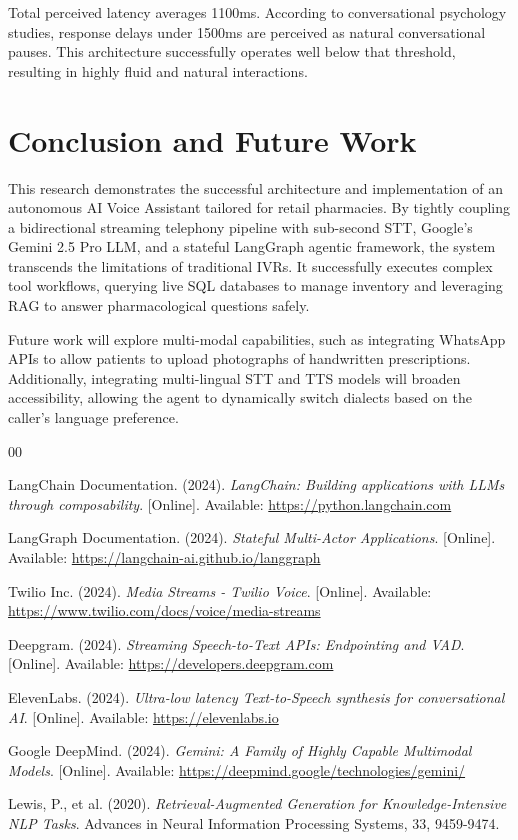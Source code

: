 \documentclass[conference,a4paper]{IEEEtran}
\begin{document}
Total perceived latency averages 1100ms. According to conversational psychology studies, response delays under 1500ms are perceived as natural conversational pauses. This architecture successfully operates well below that threshold, resulting in highly fluid and natural interactions. 

\section{Conclusion and Future Work}
This research demonstrates the successful architecture and implementation of an autonomous AI Voice Assistant tailored for retail pharmacies. By tightly coupling a bidirectional streaming telephony pipeline with sub-second STT, Google's Gemini 2.5 Pro LLM, and a stateful LangGraph agentic framework, the system transcends the limitations of traditional IVRs. It successfully executes complex tool workflows, querying live SQL databases to manage inventory and leveraging RAG to answer pharmacological questions safely. 

Future work will explore multi-modal capabilities, such as integrating WhatsApp APIs to allow patients to upload photographs of handwritten prescriptions. Additionally, integrating multi-lingual STT and TTS models will broaden accessibility, allowing the agent to dynamically switch dialects based on the caller's language preference.

\begin{thebibliography}{00}

 LangChain Documentation. (2024). \emph{LangChain: Building applications with LLMs through composability}. [Online]. Available: \url{https://python.langchain.com}

 LangGraph Documentation. (2024). \emph{Stateful Multi-Actor Applications}. [Online]. Available: \url{https://langchain-ai.github.io/langgraph}

 Twilio Inc. (2024). \emph{Media Streams - Twilio Voice}. [Online]. Available: \url{https://www.twilio.com/docs/voice/media-streams}

 Deepgram. (2024). \emph{Streaming Speech-to-Text APIs: Endpointing and VAD}. [Online]. Available: \url{https://developers.deepgram.com}

 ElevenLabs. (2024). \emph{Ultra-low latency Text-to-Speech synthesis for conversational AI}. [Online]. Available: \url{https://elevenlabs.io}

 Google DeepMind. (2024). \emph{Gemini: A Family of Highly Capable Multimodal Models}. [Online]. Available: \url{https://deepmind.google/technologies/gemini/}

 Lewis, P., et al. (2020). \emph{Retrieval-Augmented Generation for Knowledge-Intensive NLP Tasks}. Advances in Neural Information Processing Systems, 33, 9459-9474.

\end{thebibliography}
\end{document}

